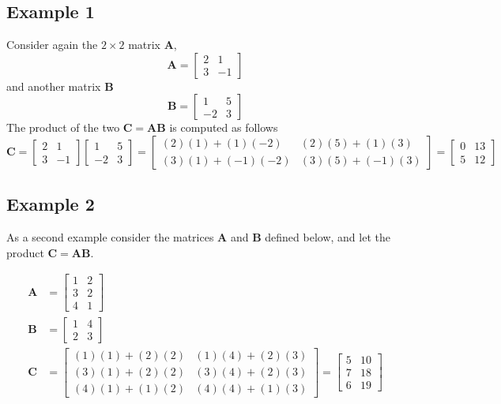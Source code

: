 \documentclass{tufte-handout}
\begin{document}
\subsection{Example 1}
Consider again the $2 \times 2$ matrix $\mathbf{A}$,
\[ \mathbf{A} =
\left[\begin{array}{rr}
2 & 1 \\
3 & -1
\end{array}\right]
\]
and another matrix $\mathbf{B}$
\[ \mathbf{B} =
\left[\begin{array}{rr}
1 & 5 \\
-2 & 3
\end{array}\right]
\]
The product of the two $\mathbf{C} = \mathbf{AB}$ is computed as follows
\[ \mathbf{C} =
\left[\begin{array}{rr}
2 & 1 \\
3 & -1
\end{array}\right]
\left[\begin{array}{rr}
1 & 5 \\
-2 & 3
\end{array}\right]
=
\left[
\begin{array}{cc}
(2)(1) + (1)(-2) & (2)(5) + (1)(3) \\
(3)(1) + (-1)(-2)  & (3)(5)  + (-1)(3)
\end{array}
\right]
=
\left[
\begin{array}{rr}
0 & 13 \\
5 & 12
\end{array}
\right]
\]


\subsection{Example 2}

As a second example consider the matrices $\mathbf{A}$ and $\mathbf{B}$ defined below, and let the product $\mathbf{C} = \mathbf{AB}$.

\begin{align*}
\mathbf{A} &=
\begin{bmatrix}
1 & 2 \\
3 & 2 \\
4 & 1
\end{bmatrix}
\\
\mathbf{B} &=
\begin{bmatrix}
1 & 4 \\
2 & 3
\end{bmatrix}
\\
\mathbf{C} &=
\begin{bmatrix}
(1)(1) + (2)(2) & (1)(4)+(2)(3) \\
(3)(1) + (2)(2) & (3)(4)+(2)(3) \\
(4)(1) + (1)(2) & (4)(4)+(1)(3)
\end{bmatrix}
 = \begin{bmatrix}
5 & 10 \\
7 & 18 \\
6 & 19
\end{bmatrix}
\end{align*}
\end{document}
